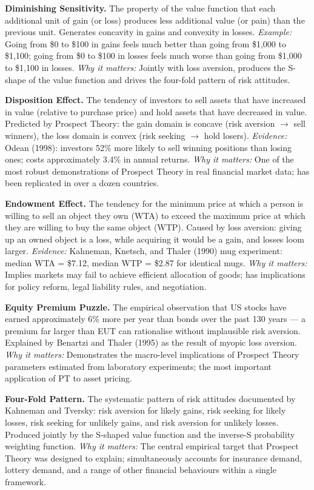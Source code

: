 \documentclass[12pt, letterpaper]{article}
\begin{document}
\textbf{Diminishing Sensitivity.} The property of the value function that each additional unit of gain (or loss) produces less additional value (or pain) than the previous unit. Generates concavity in gains and convexity in losses. \textit{Example:} Going from \$0 to \$100 in gains feels much better than going from \$1,000 to \$1,100; going from \$0 to \$100 in losses feels much worse than going from \$1,000 to \$1,100 in losses. \textit{Why it matters:} Jointly with loss aversion, produces the S-shape of the value function and drives the four-fold pattern of risk attitudes.

\textbf{Disposition Effect.} The tendency of investors to sell assets that have increased in value (relative to purchase price) and hold assets that have decreased in value. Predicted by Prospect Theory: the gain domain is concave (risk aversion $\rightarrow$ sell winners), the loss domain is convex (risk seeking $\rightarrow$ hold losers). \textit{Evidence:} Odean (1998): investors 52\% more likely to sell winning positions than losing ones; costs approximately 3.4\% in annual returns. \textit{Why it matters:} One of the most robust demonstrations of Prospect Theory in real financial market data; has been replicated in over a dozen countries.

\textbf{Endowment Effect.} The tendency for the minimum price at which a person is willing to sell an object they own (WTA) to exceed the maximum price at which they are willing to buy the same object (WTP). Caused by loss aversion: giving up an owned object is a loss, while acquiring it would be a gain, and losses loom larger. \textit{Evidence:} Kahneman, Knetsch, and Thaler (1990) mug experiment: median WTA = \$7.12, median WTP = \$2.87 for identical mugs. \textit{Why it matters:} Implies markets may fail to achieve efficient allocation of goods; has implications for policy reform, legal liability rules, and negotiation.

\textbf{Equity Premium Puzzle.} The empirical observation that US stocks have earned approximately 6\% more per year than bonds over the past 130 years --- a premium far larger than EUT can rationalise without implausible risk aversion. Explained by Benartzi and Thaler (1995) as the result of myopic loss aversion. \textit{Why it matters:} Demonstrates the macro-level implications of Prospect Theory parameters estimated from laboratory experiments; the most important application of PT to asset pricing.

\textbf{Four-Fold Pattern.} The systematic pattern of risk attitudes documented by Kahneman and Tversky: risk aversion for likely gains, risk seeking for likely losses, risk seeking for unlikely gains, and risk aversion for unlikely losses. Produced jointly by the S-shaped value function and the inverse-S probability weighting function. \textit{Why it matters:} The central empirical target that Prospect Theory was designed to explain; simultaneously accounts for insurance demand, lottery demand, and a range of other financial behaviours within a single framework.
\end{document}
